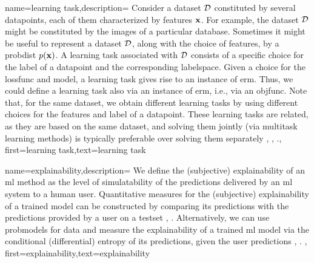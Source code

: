 {name={learning task},description=
	{Consider a \gls{dataset} $\mathcal{D}$ constituted by several \gls{datapoint}s, each of them 
	 characterized by \gls{feature}s ${\bf x}$. For example, the \gls{dataset} $\mathcal{D}$ 
	 might be constituted by the images of a particular database. Sometimes it might be useful 
	 to represent a \gls{dataset} $\mathcal{D}$, along with the choice of \gls{feature}s, by a \gls{probdist} $p({\bf x})$. 
	 A learning task associated with $\mathcal{D}$ consists of a specific 
	 choice for the \gls{label} of a \gls{datapoint} and the corresponding \gls{labelspace}. 
	 Given a choice for the \gls{lossfunc} and \gls{model}, a learning task gives rise to an 
	 instance of \gls{erm}. Thus, we could define a learning task also via an instance of \gls{erm}, i.e., 
	 via an \gls{objfunc}. Note that, for the same \gls{dataset}, we obtain different learning tasks by using 
	 different choices for the \gls{feature}s and \gls{label} of a \gls{datapoint}. These learning 
	 tasks are related, as they are based on the same \gls{dataset}, and solving them jointly 
	 (via \gls{multitask learning} methods) is typically preferable over solving them separately \cite{Caruana:1997wk}, \cite{JungGaphLassoSPL}, \cite{CSGraphSelJournal}.},
	first={learning task},text={learning task}
}

{name={explainability},description=
		{We define the (subjective) explainability of an \gls{ml} method 
			as the level of simulatability \cite{Colin:2022aa} of the \gls{prediction}s 
			delivered by an \gls{ml} system to a human user. Quantitative measures for the 
			(subjective) explainability of a trained \gls{model} can be constructed by 
			comparing its \gls{prediction}s with the \gls{prediction}s provided by a user 
			on a \gls{testset} \cite{Colin:2022aa}, \cite{Zhang:2024aa}. Alternatively, we can use 
			\gls{probmodel}s for \gls{data} and measure the explainability of a trained \gls{ml} 
			\gls{model} via the conditional (differential) entropy of its \gls{prediction}s, given the user \gls{prediction}s \cite{JunXML2020}, \cite{Chen2018}. 
		},
		first={explainability},text={explainability}
	}


